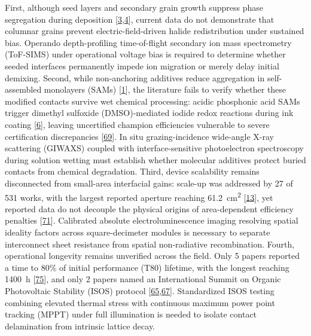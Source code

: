 \documentclass[
  11pt,
]{article}
\begin{document}
First, although seed layers and secondary grain growth suppress phase
segregation during deposition
{[}\href{https://doi.org/10.1038/s41467-026-76713-y}{3},\href{https://doi.org/10.1016/j.joule.2026.102645}{4}{]},
current data do not demonstrate that columnar grains prevent
electric-field-driven halide redistribution under sustained bias.
Operando depth-profiling time-of-flight secondary ion mass spectrometry
(ToF-SIMS) under operational voltage bias is required to determine
whether seeded interfaces permanently impede ion migration or merely
delay initial demixing. Second, while non-anchoring additives reduce
aggregation in self-assembled monolayers (SAMs)
{[}\href{https://doi.org/10.1038/s41467-026-76266-0}{1}{]}, the
literature fails to verify whether these modified contacts survive wet
chemical processing: acidic phosphonic acid SAMs trigger dimethyl
sulfoxide (DMSO)-mediated iodide redox reactions during ink coating
{[}\href{https://doi.org/10.1126/science.aeg8415}{6}{]}, leaving
uncertified champion efficiencies vulnerable to severe certification
discrepancies {[}\href{https://doi.org/10.1002/adma.74438}{69}{]}. In
situ grazing-incidence wide-angle X-ray scattering (GIWAXS) coupled with
interface-sensitive photoelectron spectroscopy during solution wetting
must establish whether molecular additives protect buried contacts from
chemical degradation. Third, device scalability remains disconnected
from small-area interfacial gains: scale-up was addressed by 27 of 531
works, with the largest reported aperture reaching
\qty{61.2}{\centi\meter\squared}
{[}\href{https://doi.org/10.1002/smll.75068}{13}{]}, yet reported data
do not decouple the physical origins of area-dependent efficiency
penalties {[}\href{https://doi.org/10.1038/s41467-026-76425-3}{71}{]}.
Calibrated absolute electroluminescence imaging resolving spatial
ideality factors across square-decimeter modules is necessary to
separate interconnect sheet resistance from spatial non-radiative
recombination. Fourth, operational longevity remains unverified across
the field. Only 5 papers reported a time to 80\% of initial performance
(T80) lifetime, with the longest reaching \qty{1400}{\hour}
{[}\href{https://doi.org/10.1002/anie.6548693}{75}{]}, and only 2 papers
named an International Summit on Organic Photovoltaic Stability (ISOS)
protocol
{[}\href{https://doi.org/10.1002/anie.4221605}{65},\href{https://doi.org/10.1038/s41467-026-76848-y}{67}{]}.
Standardized ISOS testing combining elevated thermal stress with
continuous maximum power point tracking (MPPT) under full illumination
is needed to isolate contact delamination from intrinsic lattice decay.
\end{document}
